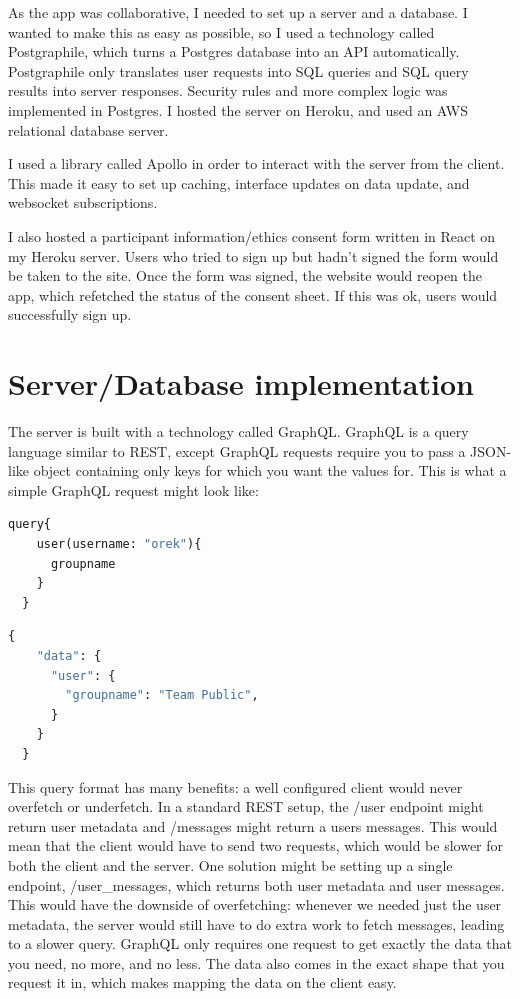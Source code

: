 \documentclass{l4proj}
\begin{document}
As the app was collaborative, I needed to set up a server and a database. I wanted to make this as easy as possible, so I used a technology called Postgraphile, which turns a Postgres database into an API automatically. Postgraphile only translates user requests into SQL queries and SQL query results into server responses. Security rules and more complex logic was implemented in Postgres. I hosted the server on Heroku, and used an AWS relational database server. 

I used a library called Apollo in order to interact with the server from the client. This made it easy to set up caching, interface updates on data update, and websocket subscriptions. 

I also hosted a participant information/ethics consent form written in React on my Heroku server. Users who tried to sign up but hadn't signed the form would be taken to the site. Once the form was signed, the website would reopen the app, which refetched the status of the consent sheet. If this was ok, users would successfully sign up.

\section{Server/Database implementation}

The server is built with a technology called GraphQL. GraphQL is a query language similar to REST, except GraphQL requests require you to pass a JSON-like object containing only keys for which you want the values for. This is what a simple GraphQL request might look like: 

\begin{lstlisting}[language=python, caption={An example GraphQL query fetching a user's group}, label=lst:callahan]
  query{
    user(username: "orek"){
      groupname
    }
  }
\end{lstlisting}

\begin{lstlisting}[language=python, caption={Response to above query}]
  {
    "data": {
      "user": {
        "groupname": "Team Public",
      }
    }
  }
\end{lstlisting}
This query format has many benefits: a well configured client would never overfetch or underfetch. In a standard REST setup, the /user endpoint might return user metadata and /messages might return a users messages. This would mean that the client would have to send two requests, which would be slower for both the client and the server. One solution might be setting up a single endpoint, /user\_messages, which returns both user metadata and user messages. This would have the downside of overfetching: whenever we needed just the user metadata, the server would still have to do extra work to fetch messages, leading to a slower query. GraphQL only requires one request to get exactly the data that you need, no more, and no less. The data also comes in the exact shape that you request it in, which makes mapping the data on the client easy. 
\end{document}
